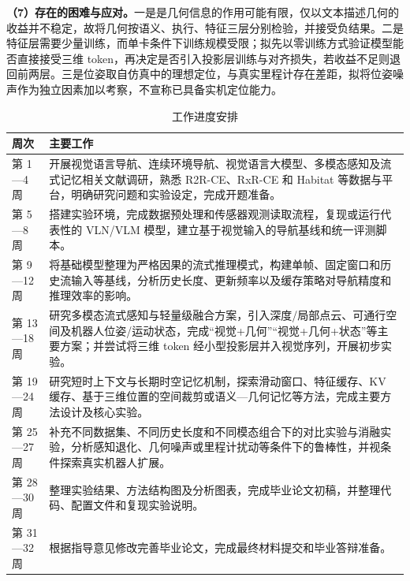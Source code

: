 \textbf{（7）存在的困难与应对。}一是是几何信息的作用可能有限，仅以文本描述几何的收益并不稳定，故将几何按语义、执行、特征三层分别检验，并接受负结果。二是特征层需要少量训练，而单卡条件下训练规模受限；拟先以零训练方式验证模型能否直接接受三维 token，再决定是否引入投影层训练与对齐损失，若收益不足则退回前两层。三是位姿取自仿真中的理想定位，与真实里程计存在差距，拟将位姿噪声作为独立因素加以考察，不宣称已具备实机定位能力。

\begin{table}[H]
  \setlength{\intextsep}{0pt}%
  \setlength{\abovecaptionskip}{4pt}%
  \centering
  \caption{工作进度安排}
  \begin{tabularx}{\textwidth}{@{}l X@{}}
    \toprule
    周次 & 主要工作 \\
    \midrule
    第 1—4 周   & 开展视觉语言导航、连续环境导航、视觉语言大模型、多模态感知及流式记忆相关文献调研，熟悉 R2R-CE、RxR-CE 和 Habitat 等数据与平台，明确研究问题和实验设定，完成开题准备。 \\
    第 5—8 周   & 搭建实验环境，完成数据预处理和传感器观测读取流程，复现或运行代表性的 VLN/VLM 模型，建立基于视觉输入的导航基线和统一评测脚本。 \\
    第 9—12 周  & 将基础模型整理为严格因果的流式推理模式，构建单帧、固定窗口和历史流输入等基线，分析历史长度、更新频率以及缓存策略对导航精度和推理效率的影响。 \\
    第 13—18 周 & 研究多模态流式感知与轻量级融合方案，引入深度/局部点云、可通行空间及机器人位姿/运动状态，完成“视觉+几何”“视觉+几何+状态”等主要方案；并尝试将三维 token 经小型投影层并入视觉序列，开展初步实验。 \\
    第 19—24 周 & 研究短时上下文与长期时空记忆机制，探索滑动窗口、特征缓存、KV 缓存、基于三维位置的空间裁剪或语义—几何记忆等方法，完成主要方法设计及核心实验。 \\
    第 25—27 周 & 补充不同数据集、不同历史长度和不同模态组合下的对比实验与消融实验，分析感知退化、几何噪声或里程计扰动等条件下的鲁棒性，并视条件探索真实机器人扩展。 \\
    第 28—30 周 & 整理实验结果、方法结构图及分析图表，完成毕业论文初稿，并整理代码、配置文件和复现实验说明。 \\
    第 31—32 周 & 根据指导意见修改完善毕业论文，完成最终材料提交和毕业答辩准备。 \\
    \bottomrule
  \end{tabularx}
\end{table}


